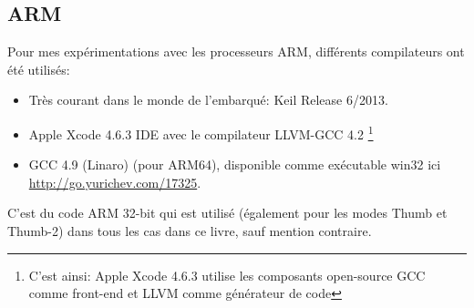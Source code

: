 \subsection{ARM}
\label{sec:hw_ARM}

\myindex{\idevices}
Pour mes expérimentations avec les processeurs ARM, différents compilateurs ont été utilisés:

\begin{itemize}
\item Très courant dans le monde de l'embarqué: Keil Release 6/2013.

\item Apple Xcode 4.6.3 IDE avec le compilateur LLVM-GCC 4.2
\footnote{C'est ainsi: Apple Xcode 4.6.3 utilise les composants open-source GCC comme front-end et LLVM
comme générateur de code} %

\item GCC 4.9 (Linaro) (pour ARM64), disponible comme exécutable win32 ici \url{http://go.yurichev.com/17325}.

\end{itemize}

C'est du code ARM 32-bit qui est utilisé (également pour les modes Thumb et Thumb-2) dans tous les
cas dans ce livre, sauf mention contraire.







